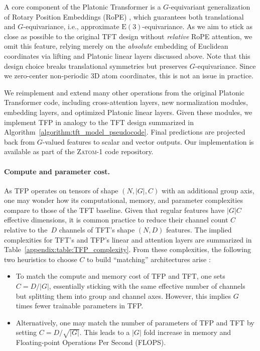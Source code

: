\documentclass{article}
\theoremstyle{plain}
\theoremstyle{definition}
\theoremstyle{remark}
\begin{document}
A core component of the Platonic Transformer is a $G$-equivariant generalization of Rotary Position Embeddings (RoPE) \citep{su2024roformer}, which guarantees both translational and $G$-equivariance, i.e., approximate $\mathrm{E}(3)$-equivariance. As we aim to stick as close as possible to the original TFT design without \emph{relative} RoPE attention, we omit this feature, relying merely on the \emph{absolute} embedding of Euclidean coordinates via lifting and Platonic linear layers discussed above. Note that this design choice breaks translational symmetries but preserves $G$-equivariance. Since we zero-center non-periodic 3D atom coordinates, this is not an issue in practice.

We reimplement and extend many other operations from the original Platonic Transformer code, including cross-attention layers, new normalization modules, embedding layers, and optimized Platonic linear layers. Given these modules, we implement TFP in analogy to the TFT design summarized in Algorithm~\ref{algorithm:tft_model_pseudocode}. Final predictions are projected back from $G$-valued features to scalar and vector outputs. Our implementation is available as part of the \textsc{Zatom-1} code repository.

\paragraph{Compute and parameter cost.}
As TFP operates on tensors of shape $(N,|G|,C)$ with an additional group axis, one may wonder how its computational, memory, and parameter complexities compare to those of the TFT baseline. Given that regular features have $|G|C$ effective dimensions, it is common practice to reduce their channel count $C$ relative to the~$D$ channels of TFT's shape $(N,D)$ features. The implied complexities for TFT's and TFP's linear and attention layers are summarized in Table~\ref{appendix:table:TFP_complexity}. From these complexities, the following two heuristics to choose $C$ to build ``matching'' architectures arise \citep{Weiler2019_E2CNN}:

\begin{itemize}[leftmargin=1.cm, align=left]
\setlength{\itemindent}{-.1cm}
\item[\emph{Compute-matching}:]
    To match the compute and memory cost of TFP and TFT, one sets $C = D/|G|$,
    essentially sticking with the same effective number of channels but splitting them into group and channel axes. However, this implies $G$ times fewer trainable parameters in TFP.
\item[\emph{Parameter-matching}:]
    Alternatively, one may match the number of parameters of TFP and TFT by setting $C = D/\sqrt{|G|}$. This leads to a $|G|$ fold increase in memory and Floating-point Operations Per Second (FLOPS).
\end{itemize}
\end{document}
